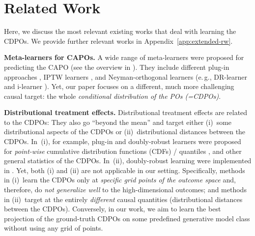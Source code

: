 \documentclass[dvipsnames]{article} %
\newcommand\eg{e.\,g.\xspace}
\newcommand{\CDPOs}{CDPOs\xspace}
\begin{document}
\section{Related Work} \label{sec:related-work}

Here, we discuss the most relevant existing works that deal with learning the \CDPOs. We provide further relevant works in Appendix~\ref{app:extended-rw}.

\textbf{Meta-learners for CAPOs.} A wide range of meta-learners \citep{kunzel2019metalearners} were proposed for predicting the CAPO (see the overview in \citet{vansteelandt2025orthogonal}). They include different plug-in approaches \citep{johansson2016learning, shalit2017estimating,johansson2022generalization}, IPTW learners \citep{hassanpour2019counterfactual,assaad2021counterfactual}, and Neyman-orthogonal learners (\eg, DR-learner \citep{kennedy2023towards} and i-learner \citep{vansteelandt2025orthogonal}). Yet, our paper focuses on a different, much more challenging causal target: the whole \emph{conditional distribution of the POs (=\CDPOs)}.


\textbf{Distributional treatment effects.} Distributional treatment effects are related to the \CDPOs: They also go ``beyond the mean'' and target either (i)~some distributional aspects of the \CDPOs or (ii)~distributional distances between the \CDPOs. In~(i), for example, plug-in and doubly-robust learners were proposed for \emph{point-wise} cumulative distribution functions (CDFs) / quantiles \citep{zhou2022estimating,kallus2023robust,balakrishnan2025conservative,wu2023dnet,ham2024doubly}, and other general statistics \citep{kallus2023robust} of the \CDPOs. In~(ii), doubly-robust learning were implemented in \citep{park2021conditional,chikahara2022feature,naf2026causaldrf}.
Yet, both (i) and (ii) are not applicable in our setting. Specifically, methods in (i)~learn the \CDPOs only at \emph{specific grid points of the outcome space} and, therefore, do \emph{not generalize well} to the high-dimensional outcomes; and methods in (ii)~target at the entirely \emph{different} causal quantities (distributional distances between the \CDPOs). Conversely, in our work, we aim to learn the best projection of the ground-truth \CDPOs on some predefined generative model class without using any grid of points.
\end{document}
